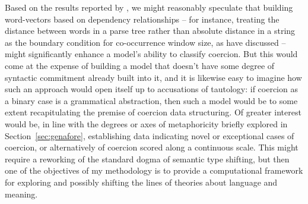 Based on the results reported by \cite{RobertsEA2011}, we might reasonably speculate that building word-vectors based on dependency relationships -- for instance, treating the distance between words in a parse tree rather than absolute distance in a string as the boundary condition for co-occurrence window size, as \cite{PadoEA2007} have discussed -- might significantly enhance a model's ability to classify coercion.  But this would come at the expense of building a model that doesn't have some degree of syntactic commitment already built into it, and it is likewise easy to imagine how such an approach would open itself up to accusations of tautology: if coercion as a binary case is a grammatical abstraction, then such a model would be to some extent recapitulating the premise of coercion data structuring.  Of greater interest would be, in line with the degrees or axes of metaphoricity briefly explored in Section~\ref{sec:genafore}, establishing data indicating novel or exceptional cases of coercion, or alternatively of coercion scored along a continuous scale.  This might require a reworking of the standard dogma of semantic type shifting, but then one of the objectives of my methodology is to provide a computational framework for exploring and possibly shifting the lines of theories about language and meaning.


